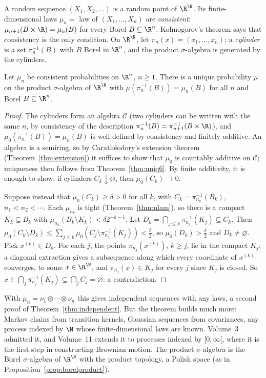 A random sequence $(X_1,X_2,\ldots)$ is a random point of $\R^\N$. Its finite-dimensional laws $\mu_n=$ law of $(X_1,\dots,X_n)$ are \emph{consistent}: $\mu_{n+1}(B\times\R)=\mu_n(B)$ for every Borel $B\subseteq\R^n$. Kolmogorov's
theorem says that consistency is the only condition. On $\R^\N$, let $\pi_n(x)=(x_1,\dots,x_n)$; a \emph{cylinder} is a set $\pi_n^{-1}(B)$ with $B$ Borel in $\R^n$, and the product $\sigma$-algebra is generated by the cylinders.

\begin{theorem}[Kolmogorov, 1933]\label{thm:kolmogorov}
Let $\mu_n$ be consistent probabilities on $\R^n$, $n\ge1$. There is a unique probability $\mu$ on the product $\sigma$-algebra of $\R^\N$ with $\mu(\pi_n^{-1}(B))=\mu_n(B)$ for all $n$ and Borel $B\subseteq\R^n$.
\end{theorem}
\begin{proof}
The cylinders form an algebra $\mathcal C$ (two cylinders can be written with the same $n$, by consistency of the description $\pi_n^{-1}(B)=\pi_{n+1}^{-1}(B\times\R)$), and $\mu_0(\pi_n^{-1}(B))=\mu_n(B)$ is well defined by consistency and finitely
additive. An algebra is a semiring, so by Carath\'eodory's extension theorem (Theorem~\ref{thm:extension}) it suffices to show that $\mu_0$ is countably additive on $\mathcal C$; uniqueness then follows from Theorem~\ref{thm:uniq6}.
By finite additivity, it is enough to show: if cylinders $C_k\downarrow\varnothing$, then $\mu_0(C_k)\to0$.

Suppose instead that $\mu_0(C_k)\ge\delta>0$ for all $k$, with $C_k=\pi_{n_k}^{-1}(B_k)$, $n_1<n_2<\cdots$. Each $\mu_{n_k}$ is tight (Theorem~\ref{thm:ulam}), so there is a compact $K_k\subseteq B_k$ with
$\mu_{n_k}(B_k\setminus K_k)<\delta2^{-k-1}$. Let $D_k=\bigcap_{j\le k}\pi_{n_j}^{-1}(K_j)\subseteq C_k$. Then $\mu_0(C_k\setminus D_k)\le\sum_{j\le k}\mu_0(C_j\setminus\pi_{n_j}^{-1}(K_j))<\frac\delta2$, so $\mu_0(D_k)>\frac\delta2$ and $D_k\ne\varnothing$.
Pick $x^{(k)}\in D_k$. For each $j$, the points $\pi_{n_j}(x^{(k)})$, $k\ge j$, lie in the compact $K_j$; a diagonal extraction gives a subsequence along which every coordinate of $x^{(k)}$ converges, to some $x\in\R^\N$, and
$\pi_{n_j}(x)\in K_j$ for every $j$ since $K_j$ is closed. So $x\in\bigcap_j\pi_{n_j}^{-1}(K_j)\subseteq\bigcap_jC_j=\varnothing$: a contradiction.
\end{proof}

With $\mu_n=\nu_1\otimes\cdots\otimes\nu_n$ this gives independent sequences with any laws, a second proof of Theorem~\ref{thm:independent}. But the theorem builds much more: Markov chains from transition kernels, Gaussian
sequences from covariances, any process indexed by $\N$ whose finite-dimensional laws are known. Volume~3 admitted it, and Volume~11 extends it to processes indexed by $[0,\infty[$, where it is the first step in constructing
Brownian motion. The product $\sigma$-algebra is the Borel $\sigma$-algebra of $\R^\N$ with the product topology, a Polish space (as in Proposition~\ref{prop:borelproduct}).


